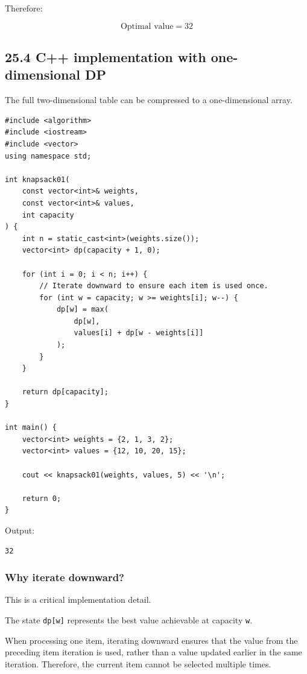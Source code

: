 Therefore:


\[
\boxed{\text{Optimal value}=32}
\]


\subsection{25.4 C++ implementation with one-dimensional DP}

The full two-dimensional table can be compressed to a one-dimensional array.

\begin{lstlisting}[style=cppstyle]
#include <algorithm>
#include <iostream>
#include <vector>
using namespace std;

int knapsack01(
    const vector<int>& weights,
    const vector<int>& values,
    int capacity
) {
    int n = static_cast<int>(weights.size());
    vector<int> dp(capacity + 1, 0);

    for (int i = 0; i < n; i++) {
        // Iterate downward to ensure each item is used once.
        for (int w = capacity; w >= weights[i]; w--) {
            dp[w] = max(
                dp[w],
                values[i] + dp[w - weights[i]]
            );
        }
    }

    return dp[capacity];
}

int main() {
    vector<int> weights = {2, 1, 3, 2};
    vector<int> values = {12, 10, 20, 15};

    cout << knapsack01(weights, values, 5) << '\n';

    return 0;
}
\end{lstlisting}

Output:

\begin{lstlisting}[style=pseudocode]
32
\end{lstlisting}

\subsubsection{Why iterate downward?}

This is a critical implementation detail.

The state \texttt{dp[w]} represents the best value achievable at capacity \texttt{w}.

When processing one item, iterating downward ensures that the value from the preceding item iteration is used, rather than a value updated earlier in the same iteration. Therefore, the current item cannot be selected multiple times.

